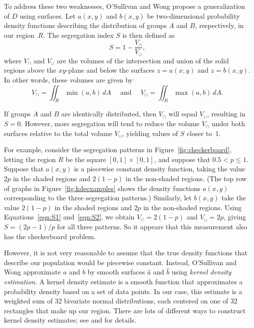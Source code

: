 \documentclass{article}
\theoremstyle{theorem}
\theoremstyle{definition}
\begin{document}
To address these two weaknesses, O'Sullivan and Wong \cite{sullivanwong07} propose a generalization of $D$ using surfaces. Let $a(x,y)$ and $b(x,y)$ be two-dimensional probability density functions describing the distribution of groups $A$ and $B$, respectively, in our region~$R$. The segregation index $S$ is then defined as
\begin{equation}\label{eqn:S1}
  S = 1 - \frac{V_\cap}{V_\cup},
\end{equation}
where $V_\cap$ and $V_\cup$ are the volumes of the intersection and union of the solid regions above the $xy$-plane and below the surfaces $z = a(x,y)$ and $z=b(x,y)$. In other words, these volumes are given by
\begin{equation}\label{eqn:S2}
  V_\cap = \iint_R \min(a, b) \, dA \quad \text{ and } \quad V_\cup = \iint_R \max(a,b) \, dA.
\end{equation}

If groups $A$ and $B$ are identically distributed, then $V_\cap$ will equal $V_\cup$, resulting in $S = 0$. However, more segregation will tend to reduce the volume $V_\cap$ under both surfaces relative to the total volume $V_\cup$, yielding values of $S$ closer to~1.

For example, consider the segregation patterns in Figure~\ref{fig:checkerboard}, letting the region $R$ be the square $[0,1] \times [0,1]$, and suppose that $0.5 < p \leq 1$. Suppose that $a(x,y)$ is a piecewise constant density function, taking the value $2p$ in the shaded regions and $2(1-p)$ in the non-shaded regions. (The top row of graphs in Figure~\ref{fig:kdeexamples} shows the density functions $a(x,y)$ corresponding to the three segregation patterns.) Similarly, let $b(x,y)$ take the value $2(1-p)$ in the shaded regions and $2p$ in the non-shaded regions. Using Equations~\ref{eqn:S1} and~\ref{eqn:S2}, we obtain $V_\cap = 2(1-p)$ and $V_\cup = 2p$, giving $S = (2p-1)/p$ for all three patterns. So it appears that this measurement also has the checkerboard problem.

However, it is not very reasonable to assume that the true density functions that describe our population would be piecewise constant. Instead, O'Sullivan and Wong approximate $a$ and $b$ by smooth surfaces $\hat{a}$ and $\hat{b}$ using \textit{kernel density estimation}. A kernel density estimate is a smooth function that approximates a probability density based on a set of data points. \cite{wandjones11} In our case, this estimate is a weighted sum of 32 bivariate normal distributions, each centered on one of 32 rectangles that make up our region. There are lots of different ways to construct kernel density estimates; see \cite{wandjones11} and \cite{dengwickham11} for details.
\end{document}
